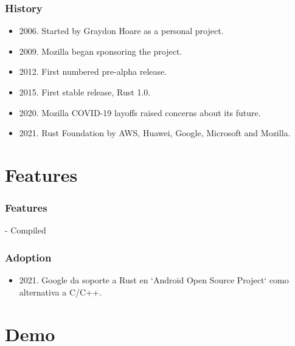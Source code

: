 \documentclass{beamer}
\begin{document}
\begin{frame}

\frametitle{History}

\begin{itemize}
\item 2006. Started by Graydon Hoare as a personal project.
\item 2009. Mozilla began sponsoring the project.
\item 2012. First numbered pre-alpha release.
\item 2015. First stable release, Rust 1.0.
\item 2020. Mozilla COVID-19 layoffs raised concerns about its future.
\item 2021. Rust Foundation by AWS, Huawei, Google, Microsoft and Mozilla.
\end{itemize}

\end{frame}

\section{Features}

\begin{frame}
\frametitle{Features}

- Compiled

\end{frame}

\begin{frame}
\frametitle{Adoption}
\begin{itemize}
\item 2021. Google da soporte a Rust en `Android Open Source Project` como alternativa a C/C++.
\end{itemize}

\end{frame}

\section{Demo}
\end{document}

